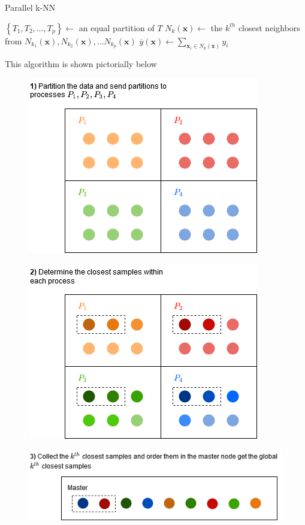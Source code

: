 \begin{algorithm}[ht!]
\caption{Parallel k-NN}
\label{alg:parallel-k-NN}
\footnotesize
\SetAlgoLined
    \BlankLine
    $\left\lbrace T_{1} , T_{2}, \ldots , T_{p} \right\rbrace \gets$ an equal partition of $T$\;
    $N_{k} (\bm{x}) \gets$ the $k^{th}$ closest neighbors from $N_{k_1} (\bm{x}), N_{k_2} (\bm{x}), \ldots N_{k_p} (\bm{x})$\;
    $\overline{y} \left( \bm{x} \right) \gets \sum_{\bm{x}_{i} \in N_{k} (\bm{x})} y_{i}$\;
    \BlankLine
\end{algorithm}
This algorithm is shown pictorially below
\begin{figure}[H]
    \includegraphics[scale=0.7]{img/STAT4402_tut_KNN_1.png}
    \centering
    \label{fig:STAT4402_tut_KNN_1}
\end{figure}
\begin{figure}[H]
    \includegraphics[scale=0.7]{img/STAT4402_tut_KNN_2.png}
    \centering
    \label{fig:STAT4402_tut_KNN_2}
\end{figure}
\begin{figure}[H]
    \includegraphics[scale=0.7]{img/STAT4402_tut_KNN_3.png}
    \centering
    \label{fig:STAT4402_tut_KNN_3}
\end{figure}